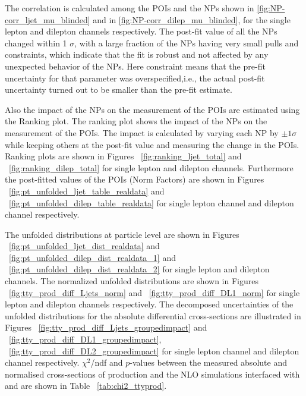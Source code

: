 The correlation is calculated among the POIs and the NPs shown in \cref{fig:NP-corr_ljet_mu_blinded} and in \cref{fig:NP-corr_dilep_mu_blinded}, for the single lepton and dilepton channels respectively. The post-fit value of all the NPs changed within 1 $\sigma$, with a large fraction of the NPs having very small pulls and constraints, which indicate that the fit is robust and not affected by any unexpected behavior of the NPs. Here constraint means that the pre-fit uncertainty for that parameter was overspecified,i.e., the actual post-fit uncertainty turned out to be smaller than the pre-fit estimate. %

Also the impact of the NPs on the measurement of the POIs are estimated using the Ranking plot. 
The ranking plot shows the impact of the NPs on the measurement of the POIs. The impact is calculated by varying each NP by $\pm 1 \sigma$ while keeping others at the post-fit value and measuring the change in the POIs. Ranking plots are shown in Figures ~\ref{fig:ranking_ljet_total} and ~\ref{fig:ranking_dilep_total} for single lepton and dilepton channels. Furthermore the post-fitted values of the POIs (Norm Factors) are shown in Figures ~\ref{fig:pt_unfolded_ljet_table_realdata} and ~\ref{fig:pt_unfolded_dilep_table_realdata} for single lepton channel and dilepton channel respectively. %

The unfolded distributions at particle level are shown in Figures ~\ref{fig:pt_unfolded_ljet_dist_realdata} and ~\ref{fig:pt_unfolded_dilep_dist_realdata_1} and ~\ref{fig:pt_unfolded_dilep_dist_realdata_2} for single lepton and dilepton channels. The normalized unfolded distributions are shown in Figures ~\ref{fig:tty_prod_diff_Ljets_norm} and ~\ref{fig:tty_prod_diff_DL1_norm} for single lepton and dilepton channels respectively. The decomposed uncertainties of the unfolded distributions for the absolute differential cross-sections are illustrated in Figures ~\ref{fig:tty_prod_diff_Ljets_groupedimpact} and ~\ref{fig:tty_prod_diff_DL1_groupedimpact}, ~\ref{fig:tty_prod_diff_DL2_groupedimpact} for single lepton channel and dilepton channel respectively. $\chi^2$/ndf and $p$-values between the measured absolute and normalised cross-sections of \tty production and the NLO \MGNLO simulations interfaced with \PYTHIA[8] and \HERWIG[7] are shown in Table ~\ref{tab:chi2_ttyprod}.





